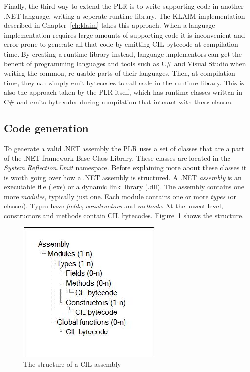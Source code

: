 	Finally, the third way to extend the PLR is to write supporting code in
	another .NET language, writing a seperate runtime library. The KLAIM 
	implementation described in Chapter~\ref{ch:klaim} takes this approach. When 
	a language implementation requires large amounts of supporting code it is 
	inconvenient and error prone to generate all that code by emitting CIL 
	bytecode at compilation time. By creating a runtime library instead, 
	language implementors can get the benefit of programming languages and tools 
	such as C\# and Visual Studio when writing the common, re-usable parts of 
	their languages. Then, at compilation time, they can simply emit bytecodes 
	to call code in the runtime library. This is also the approach taken by the 
	PLR itself, which has runtime classes written in C\# and emits bytecodes 
	during compilation that interact with these classes.	

\subsection{Code generation}
	
	To generate a valid .NET assembly the PLR uses a set of classes that are a 
	part of the .NET framework Base Class Library. These classes are located in 
	the \textit{System.Reflection.Emit} namespace. Before explaining more about 
	these classes it is worth going over how a .NET assembly is structured. A 
	.NET \textit{assembly} is an executable file (.exe) or a dynamic link 
	library (.dll). The assembly contains one more \textit{modules}, typically 
	just one. Each module contains one or more \textit{types} (or classes). 
	Types have \textit{fields}, \textit{constructors} and \textit{methods}. At 
	the lowest level, constructors and methods contain CIL bytecodes. 
	Figure~\ref{fig:assembly} shows the structure.

	\begin{figure}[h!]
		\centering
		\includegraphics{assembly2.jpg}
		\caption{The structure of a CIL assembly}
		\label{fig:assembly}
	\end{figure}
	
